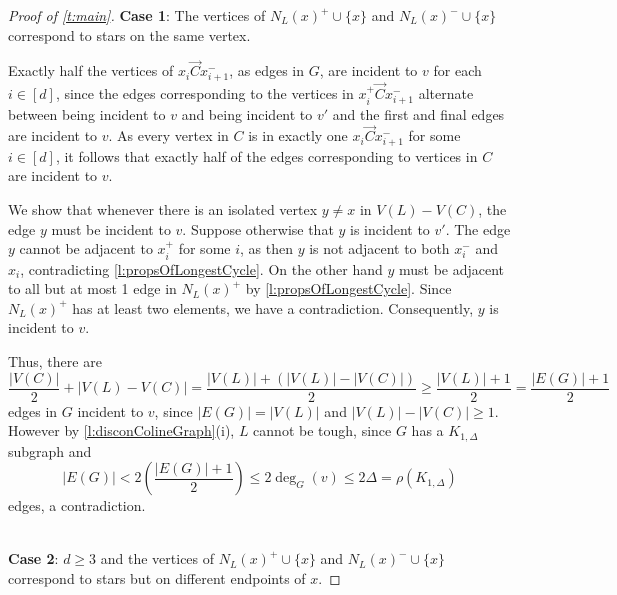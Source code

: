 \documentclass[10pt,a4paper]{amsart}
\newcommand{\ora}{\overrightarrow{C}}
\begin{document}
\begin{proof}[Proof of \cref{t:main}]
\noindent \textbf{Case 1}: The vertices of $N_L(x)^+\cup\{x\}$ and $N_L(x)^-\cup \{ x\}$ correspond to stars on the same vertex. %

Exactly half the vertices  of $x_i \ora x_{i+1}^-$, as edges in $G$, are incident to $v$ for each $i \in [d]$, since the edges corresponding to the vertices in $x_i^+ \ora x_{i+1}^-$ alternate between being incident to $v$ and being incident to $v'$ and the first and final edges are incident to $v$. 
As every vertex in $C$ is in exactly one $x_i \ora x_{i+1}^-$ for some $i\in [d]$, it follows that exactly half of the edges corresponding to vertices in $C$ are incident to $v$.

We show that whenever there is an isolated vertex $y \neq x$ in $V(L)-V(C)$, the edge $y$ must be incident to $v$. Suppose otherwise that $y$ is incident to $v'$. 
The edge $y$ cannot be adjacent to $x_i^+$ for some $i$, as then $y$ is not adjacent to both $x_i^-$ and $x_i$, contradicting \cref{l:propsOfLongestCycle}. On the other hand
$y$ must be adjacent to all but at most 1 edge in $N_L(x)^+$ by \cref{l:propsOfLongestCycle}. Since $N_L(x)^+$ has at least two elements, we have a contradiction. Consequently, $y$ is incident to $v$.

Thus, there are 
\[
\frac{|V(C)|}{2}+|V(L)-V(C)|  = \frac{|V(L)|+(|V(L)|-|V(C)|)}{2}\geq \frac{|V(L)|+1}{2} = \frac{|E(G)|+1}{2}
\] 
edges in $G$ incident to $v$, since $|E(G)|=|V(L)|$ and $|V(L)|-|V(C)| \geq 1$.
However by \cref{l:disconColineGraph}(i), $L$ cannot be tough, since $G$ has a $K_{1,\Delta}$ subgraph and 
\[
|E(G)| < 2\left(\frac{|E(G)|+1}{2} \right)\leq 2\deg_G(v) \leq 2\Delta = \rho(K_{1,\Delta})
\]
edges, a contradiction.

$ $
\\
\noindent \textbf{Case 2}: $d\geq 3$ and the vertices of $N_L(x)^+ \cup \{x\}$ and $N_L(x)^- \cup \{x\}$ correspond to stars but on different endpoints of $x$.


\end{proof}
\end{document}
